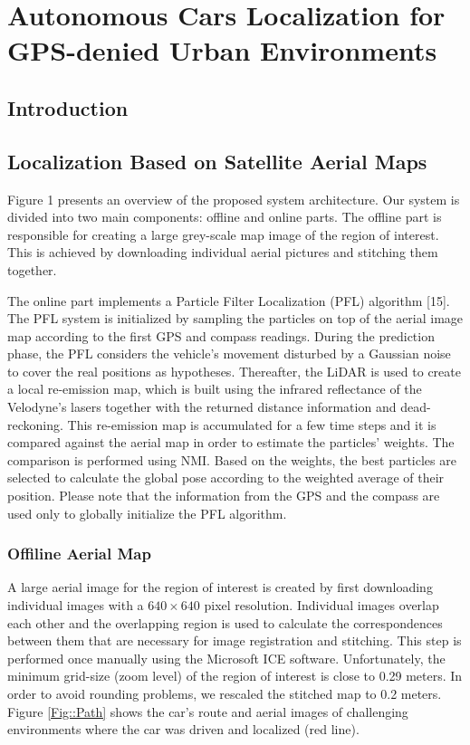 \chapter{Autonomous Cars Localization for GPS-denied Urban Environments}

\section{Introduction}


\section{Localization Based on Satellite Aerial Maps}

Figure 1 presents an overview of the proposed system architecture. Our system is divided into two main components: offline and online parts. The offline part is responsible for creating a large grey-scale map image of the region of interest. This is achieved by downloading individual aerial pictures and stitching them together.

The online part implements a Particle Filter Localization (PFL) algorithm [15]. The PFL system is initialized by sampling the particles on top of the aerial image map according to the first GPS and compass readings. During the prediction phase, the PFL considers the vehicle's movement disturbed by a Gaussian noise to cover the real positions as hypotheses. Thereafter, the LiDAR is used to create a local re-emission map, which is built using the infrared reflectance of the Velodyne's lasers together with the returned distance information and dead-reckoning. This re-emission map is accumulated for a few time steps and it is compared against the aerial map in order to estimate the particles' weights. The comparison is performed using NMI. Based on the weights, the best particles are selected to calculate the global pose according to the weighted average of their position. Please note that the information from the GPS and the compass are used only to globally initialize the PFL algorithm.

\subsection{Offiline Aerial Map}

A large aerial image for the region of interest is created by first downloading individual images with a $640\times640$ pixel resolution. Individual images overlap each other and the overlapping region is used to calculate the correspondences between them that are necessary for image registration and stitching. This step is performed once manually using the Microsoft ICE software. Unfortunately, the minimum grid-size (zoom level) of the region of interest is close to 0.29 meters. In order to avoid rounding problems, we rescaled the stitched map to 0.2 meters. Figure \ref{Fig::Path} shows the car's route and aerial images of challenging environments where the car was driven and localized (red line).

